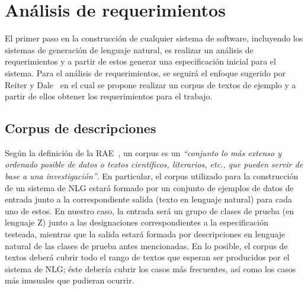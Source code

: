 \chapter{Análisis de requerimientos}
\label{cap:corpus}

El primer paso en la construcción de cualquier sistema de software, incluyendo los sistemas de generación de lenguaje natural, es realizar un análisis de requerimientos y a partir de estos generar una especificación inicial para el sistema. Para el análisis de requerimientos, se seguirá el enfoque sugerido por Reiter y Dale~\cite{reiter_dale} en el cual se propone realizar un corpus de textos de ejemplo y a partir de ellos obtener los requerimientos para el trabajo.

\section{Corpus de descripciones}                 

Según la definición de la RAE~\cite{dicrae}, un corpus es un \emph{``conjunto lo más extenso y ordenado posible de datos o textos científicos, literarios, etc., que pueden servir de base a una investigación''}. En particular, el corpus utilizado para la construcción de un sistema de NLG estará formado por un conjunto de ejemplos de datos de entrada junto a la correspondiente salida (texto en lenguaje natural) para cada uno de estos. En nuestro caso, la entrada será un grupo de clases de prueba (en lenguaje Z) junto a las designaciones correspondientes a la especificación testeada, mientras que la salida estará formada por descripciones en lenguaje natural de las clases de prueba antes mencionadas. En lo posible, el corpus de textos deberá cubrir todo el rango de textos que esperan ser producidos por el sistema de NLG; éste debería cubrir los casos más frecuentes, así como los casos más inusuales que pudieran ocurrir.

